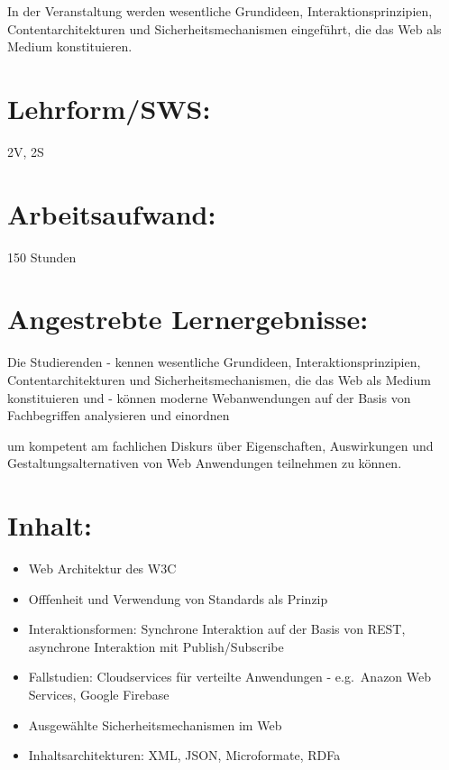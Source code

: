 In der Veranstaltung werden wesentliche Grundideen,
Interaktionsprinzipien, Contentarchitekturen und Sicherheitsmechanismen
eingeführt, die das Web als Medium konstituieren.

\section{Lehrform/SWS:}\label{lehrformsws-11}

2V, 2S

\section{Arbeitsaufwand:}\label{arbeitsaufwand-11}

150 Stunden

\section{Angestrebte
Lernergebnisse:}\label{angestrebte-lernergebnisse-11}

Die Studierenden - kennen wesentliche Grundideen,
Interaktionsprinzipien, Contentarchitekturen und Sicherheitsmechanismen,
die das Web als Medium konstituieren und - können moderne Webanwendungen
auf der Basis von Fachbegriffen analysieren und einordnen

um kompetent am fachlichen Diskurs über Eigenschaften, Auswirkungen und
Gestaltungsalternativen von Web Anwendungen teilnehmen zu können.

\section{Inhalt:}\label{inhalt-11}

\begin{itemize}
\tightlist
\item
  Web Architektur des W3C
\item
  Offfenheit und Verwendung von Standards als Prinzip
\item
  Interaktionsformen: Synchrone Interaktion auf der Basis von REST,
  asynchrone Interaktion mit Publish/Subscribe
\item
  Fallstudien: Cloudservices für verteilte Anwendungen - e.g.~Anazon Web
  Services, Google Firebase
\item
  Ausgewählte Sicherheitsmechanismen im Web
\item
  Inhaltsarchitekturen: XML, JSON, Microformate, RDFa
\end{itemize}

